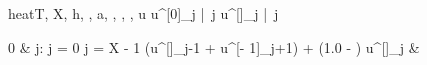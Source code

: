 \documentclass[12pt,a4paper]{book}
\begin{document}

\begin{eqcode}{heat}{T, X, h, \tau, a}{, , ,
, }{}
  \pi {} \lend
  u \in {} \lend
  u^{[0]}_j |\ \forall j \gets {} \lend
  u^{[\iter]}_j |\ \forall j \quad \; \; \gets 
  \begin{cases}
    0 & j: j = 0 \cup j = X - 1 \lend
   \cdot (u^{[]}_{j-1} +
    u^{[\iter - 1]}_{j+1}) + (1.0 - ) \cdot
    u^{[]}_j & \otherwise \lend
  \end{cases} \lend
   \lend
\end{eqcode}

\begin{eqcode}{\mu}{\ }{\ }{}
   \lend
   \lend
\end{eqcode}
\end{document}
